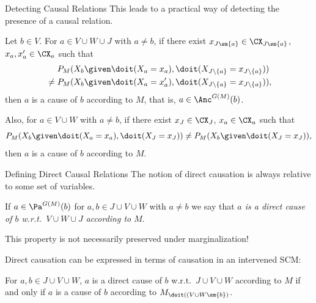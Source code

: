 \begin{frame}{Detecting Causal Relations}
This leads to a practical way of detecting the presence of a causal relation.
  \begin{Cor}[\ref{cor:scm_identify_causal_relation}]
  Let $b \in V$.
  For $a \in V \cup W \cup J$ with $a \ne b$, if
  there exist $x_{J\sm\{a\}} \in \CX_{J\sm\{a\}}$, $x_a,x_a' \in \CX_a$ such that
      \begin{equation*}\begin{split}
        & P_{M}(X_b \given \doit(X_a=x_a),\doit(X_{J\setminus \{a\}}=x_{J\setminus \{a\}})) \\
        {} \ne {} & P_{M}(X_b \given \doit(X_a=x_a'),\doit(X_{J\setminus\{a\}}=x_{J\setminus\{a\}})),
      \end{split}\end{equation*}
  then $a$ is a cause of $b$ according to $M$, that is, $a \in \Anc^{G(M)}(b)$.

  Also, for $a \in V \cup W$ with $a \ne b$, if
  there exist $x_J \in \CX_J$, $x_a \in \CX_a$ such that
  $$P_{M}(X_b \given \doit(X_a=x_a),\doit(X_J=x_J)) \ne P_{M}(X_b \given \doit(X_J=x_J)),$$
  then $a$ is a cause of $b$ according to $M$.  
\end{Cor}
\end{frame}

\begin{frame}{Defining Direct Causal Relations}
The notion of direct causation is always relative to some set of variables.
\begin{Def}[\ref{def:direct_cause_of}]
  If $a \in \Pa^{G(M)}(b)$ for $a, b \in J \cup V \cup W$ with $a\ne b$ we say that \emph{$a$ is a direct cause of $b$ w.r.t.\ $V \cup W \cup J$ according to $M$}.
\end{Def}
This property is not necessarily preserved under marginalization!

\bigskip
Direct causation can be expressed in terms of causation in an intervened SCM:
\begin{Prp}[\ref{prp:direct_cause_of}]
  For $a,b \in J \cup V \cup W$, $a$ is a direct cause of $b$ w.r.t.\ $J \cup V \cup W$ according to $M$ if and only if $a$ is a cause of $b$ according to $M_{\doit((V \cup W \sm \{b\})}$.
\end{Prp}

\end{frame}

